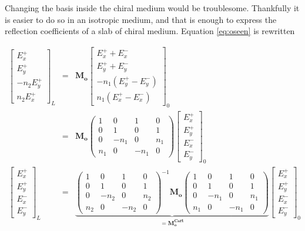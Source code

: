 Changing the basis inside the chiral medium would be troublesome. Thankfully it is easier to do so in an isotropic medium, and that is enough to express the reflection coefficients of a slab of chiral medium. Equation \ref{eq:oseen} is rewritten

\begin{eqnarray}
\begin{bmatrix}
E_x^+\\E_y^+\\-n_2 E_y^+\\n_2 E_x^+
\end{bmatrix}_L &=& \bm{M_o}\begin{bmatrix}
E_x^+ + E_x^-\\E_y^+ + E_y^-\\-n_1(E_y^+ - E_y^-)\\n_1(E_x^+ - E_x^-)
\end{bmatrix}_0\\
&=&\bm{M_o}\begin{pmatrix}
1 & 0 & 1 & 0\\
0 & 1 & 0 & 1\\
0 & -n_1 & 0 & n_1\\
n_1 & 0 & -n_1 & 0
\end{pmatrix}\begin{bmatrix}
E_x^+\\E_y^+\\E_x^-\\E_y^-
\end{bmatrix}_0\\
\begin{bmatrix}
E_x^+\\E_y^+\\E_x^-\\E_y^-
\end{bmatrix}_L &=&\underbrace{\begin{pmatrix}
1 & 0 & 1 & 0\\
0 & 1 & 0 & 1\\
0 & -n_2 & 0 & n_2\\
n_2 & 0 & -n_2 & 0
\end{pmatrix}^{-1}\bm{M_o}\begin{pmatrix}
1 & 0 & 1 & 0\\
0 & 1 & 0 & 1\\
0 & -n_1 & 0 & n_1\\
n_1 & 0 & -n_1 & 0
\end{pmatrix}}_{=\bm{M_o^{\text{Cart}}}}\begin{bmatrix}
E_x^+\\E_y^+\\E_x^-\\E_y^-
\end{bmatrix}_0
\end{eqnarray}
